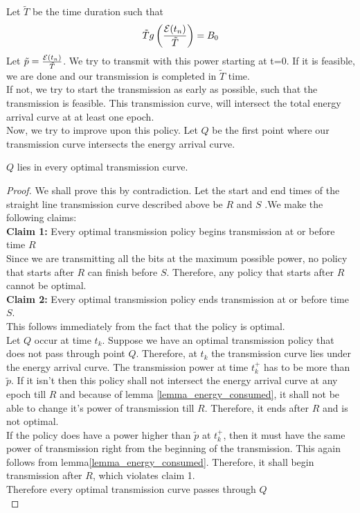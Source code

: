 Let $\tilde{T}$ be the time duration such that
\begin{equation}
\tilde{T}g\left(\frac{\mathcal{E}(t_n)}{\tilde{T}}\right)=B_0
\end{equation}
Let $\tilde{p}=\frac{\mathcal{E}(t_n)}{\tilde{T}}$. We try to transmit with this power starting at t=0. If it is feasible, we are done and our transmission is completed in $\tilde{T}$ time.\\
If not, we try to start the transmission as early as possible, such that the transmission is feasible. This transmission curve, will intersect the total energy arrival curve at at least one epoch.\\
Now, we try to improve upon this policy. Let $Q$ be the first point where our transmission curve intersects the energy arrival curve.\\
\begin{lemma}
$Q$ lies in every optimal transmission curve.
\end{lemma}
\begin{proof}
We shall prove this by contradiction. Let the start and end times of the straight line transmission curve described above be $R$ and $S$ .We make the following claims:\\
\textbf{Claim 1:} Every optimal transmission policy begins transmission at or before time $R$\\
Since we are transmitting all the bits at the maximum possible power, no policy that starts after $R$ can finish before $S$. Therefore, any policy that starts after $R$ cannot be optimal.\\
\textbf{Claim 2:} Every optimal transmission policy ends transmission at or before time $S$.\\
This follows immediately from the fact that the policy is optimal. \\
Let $Q$ occur at time $t_k$. Suppose we have an optimal transmission policy that does not pass through point $Q$. Therefore, at $t_k$ the transmission curve lies under the energy arrival curve. The transmission power at time $t_k^+$ has to be more than $\tilde{p}$. If it isn't then this policy shall not intersect the energy arrival curve at any epoch till $R$ and because of lemma \ref{lemma_energy_consumed}, it shall not be able to change it's power of transmission till $R$. Therefore, it ends after $R$ and is not optimal.\\
If the policy does have a power higher than $\tilde{p}$ at $t_k^+$, then it must have the same power of transmission right from the beginning of the transmission. This again follows from lemma\ref{lemma_energy_consumed}. Therefore, it shall begin transmission after $R$, which violates claim 1. \\
Therefore every optimal transmission curve passes through $Q$\\
\end{proof}

